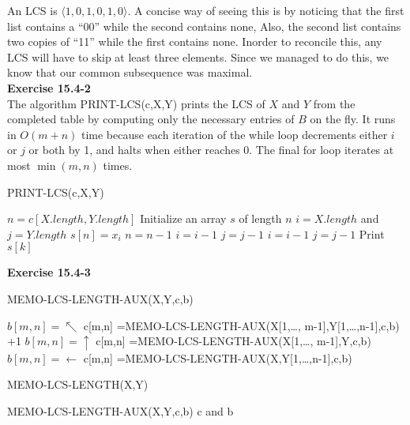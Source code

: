 \documentclass{article}
\begin{document}
An LCS is $\langle 1,0,1,0,1,0\rangle$. A concise way of seeing this is by noticing that the first list contains a ``00'' while the second contains none, Also, the second list contains two copies of ``11'' while the first contains none. Inorder to reconcile this, any LCS will have to skip at least three elements. Since we managed to do this, we know that our common subsequence was maximal.\\

\noindent\textbf{Exercise 15.4-2}\\

The algorithm PRINT-LCS(c,X,Y) prints the LCS of $X$ and $Y$ from the completed table by computing only the necessary entries of $B$ on the fly.  It runs in $O(m+n)$ time because each iteration of the while loop decrements either $i$ or $j$ or both by 1, and halts when either reaches 0. The final for loop iterates at most $\min(m, n)$ times. 
\begin{algorithm}
\caption{PRINT-LCS(c,X,Y)}
\begin{algorithmic}
\State $n = c[X.length, Y.length]$
\State Initialize an array $s$ of length $n$
\State $i=X.length$ and $j=Y.length$
		\State $s[n] = x_i$
		\State $n = n - 1$
		\State $i = i - 1$
		\State $j = j - 1$
		\State $i = i - 1$
	\Else
		\State $j = j - 1$
	\EndIf
\EndWhile
{}
	\State Print $s[k]$
\EndFor
\end{algorithmic}
\end{algorithm}

\noindent\textbf{Exercise 15.4-3}\\

\begin{algorithm}
\caption{MEMO-LCS-LENGTH-AUX(X,Y,c,b)}
\begin{algorithmic}
\State \Return
\EndIf
{}
\State $b[m,n] = \nwarrow$
\State c[m,n] =MEMO-LCS-LENGTH-AUX(X[1,\ldots, m-1],Y[1,\ldots,n-1],c,b) +1
\State $b[m,n] = \uparrow$
\State c[m,n] =MEMO-LCS-LENGTH-AUX(X[1,\ldots, m-1],Y,c,b)
\Else
\State $b[m,n] = \leftarrow$
\State c[m,n] =MEMO-LCS-LENGTH-AUX(X,Y[1,\ldots,n-1],c,b) 
\EndIf
\end{algorithmic}
\end{algorithm}

\begin{algorithm}
\caption{MEMO-LCS-LENGTH(X,Y)}
\begin{algorithmic}
\State MEMO-LCS-LENGTH-AUX(X,Y,c,b)
\State \Return c and b
\end{algorithmic}
\end{algorithm}
\end{document}
